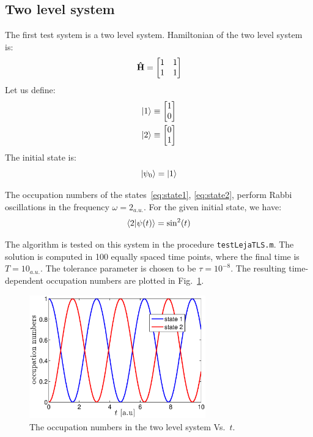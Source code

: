 \documentclass[12pt, a4paper]{article}
\begin{document}
\subsection{Two level system}
The first test system is a two level system. Hamiltonian of the two level system is:
\begin{equation}
	\mathbf{\hat H} =
	\begin{bmatrix}
		1 & 1 \\
		1 & 1
	\end{bmatrix}
\end{equation}
Let us define:
\begin{align}
	\left|1\right> &\equiv
	\begin{bmatrix}
		1  \\
		0	
	\end{bmatrix} \label{eq:state1}\\ 
	\left|2\right> &\equiv
	\begin{bmatrix}
		0  \\
		1	
	\end{bmatrix} \label{eq:state2}
\end{align}
The initial state is:
\begin{equation*}
	\left|\psi_0\right> = \left|1\right>
\end{equation*}

The occupation numbers of the states~\eqref{eq:state1}, \eqref{eq:state2}, perform Rabbi oscillations in the frequency $\omega=2_{a.u.}$. For the given initial state, we have:
\begin{equation}\label{eq:TLSanal}
	\left<2 | \psi(t)\right> = \sin^2(t)
\end{equation}

The algorithm is tested on this system in the procedure \texttt{testLejaTLS.m}. The solution is computed in 100 equally spaced time points, where the final time is $T=10_{a.u.}$. The tolerance parameter is chosen to be $\tau=10^{-8}$. The resulting time-dependent occupation numbers are plotted in Fig.~\ref{fig:TLS}. 

\begin{figure}[htb]
	\centering\includegraphics[width=3in]{TLSoc}
	\caption{The occupation numbers in the two level system Vs.\ $t$.}\label{fig:TLS}
\end{figure}
\end{document}
